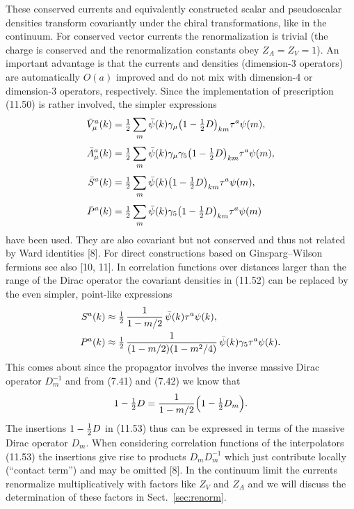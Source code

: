 These conserved currents and equivalently constructed scalar and pseudoscalar
densities transform covariantly under the chiral transformations, like in the
continuum. For conserved vector currents the renormalization is trivial (the
charge is conserved and the renormalization constants obey $Z_A = Z_V = 1$).
An important advantage is that the currents and densities (dimension-3 operators) are automatically $O(a)$ improved and do not mix with dimension-4
or dimension-3 operators, respectively.
Since the implementation of prescription (11.50) is rather involved, the
simpler expressions
\begin{equation}
\begin{aligned}
\bar{V}_\mu^a(k) &=
\tfrac{1}{2} \sum_m \bar{\psi}(k)\gamma_\mu\bigl(1 - \tfrac{1}{2} D\bigr)_{km}\tau^a\psi(m) , \\[1mm]
\bar{A}_\mu^a(k) &=
\tfrac{1}{2} \sum_m \bar{\psi}(k)\gamma_\mu\gamma_5\bigl(1 - \tfrac{1}{2} D\bigr)_{km}\tau^a\psi(m) , \\[1mm]
\bar{S}^a(k) &=
\tfrac{1}{2} \sum_m \bar{\psi}(k)\bigl(1 - \tfrac{1}{2} D\bigr)_{km}\tau^a\psi(m) , \\[1mm]
\bar{P}^a(k) &=
\tfrac{1}{2} \sum_m \bar{\psi}(k)\gamma_5\bigl(1 - \tfrac{1}{2} D\bigr)_{km}\tau^a\psi(m)
\end{aligned}
\end{equation}
have been used. They are also covariant but not conserved and thus not related
by Ward identities [8]. For direct constructions based on Ginsparg--Wilson
fermions see also [10, 11].
In correlation functions over distances larger than the range of the Dirac
operator the covariant densities in (11.52) can be replaced by the even simpler,
point-like expressions
\begin{equation}
\begin{aligned}
S^a(k) &\approx \tfrac{1}{2}\, \frac{1}{1 - m/2}\,\bar{\psi}(k)\tau^a\psi(k) , \\
P^a(k) &\approx \tfrac{1}{2}\, \frac{1}{(1 - m/2)(1 - m^2/4)}\,\bar{\psi}(k)\gamma_5\tau^a\psi(k) .
\end{aligned}
\end{equation}
This comes about since the propagator involves the inverse massive Dirac
operator $D_m^{-1}$ and from (7.41) and (7.42) we know that
\begin{equation}
1 - \tfrac{1}{2} D = \frac{1}{1 - m/2}\Bigl(1 - \tfrac{1}{2} D_m\Bigr) .
\end{equation}
The insertions $1 - \tfrac{1}{2} D$ in (11.53) thus can be expressed in terms of the massive
Dirac operator $D_m$. When considering correlation functions of the interpolators (11.53) the insertions give rise to products $D_m D_m^{-1}$ which just contribute
locally (``contact term'') and may be omitted [8].
In the continuum limit the currents renormalize multiplicatively with factors like $Z_V$ and $Z_A$ and we will discuss the determination of these factors in
Sect.~\ref{sec:renorm}.

